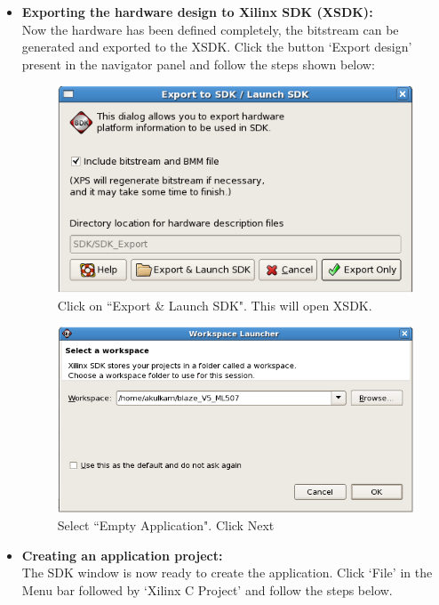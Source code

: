 \documentclass[a4paper,oneside]{memoir}
\begin{document}
\begin{itemize}
\item \textbf{Exporting the hardware design to Xilinx SDK (XSDK):}\label{sec:expot_sdk_blaze}\\
Now the hardware has been defined completely, the bitstream can be generated and exported to the XSDK. Click the button `Export design' present in the navigator panel and follow the steps shown below:

\begin{figure}[H]
\centering
\includegraphics[scale=0.5]{softwarestep1}
\caption{Click on ``Export \& Launch SDK". This will open XSDK. \label{fig:softwarestep1}}
\end{figure}
\begin{figure}[H]
\centering
\includegraphics[scale=0.5]{softwarestep2}
\caption{Select ``Empty Application". Click Next \label{fig:softwarestep2}}
\end{figure}

\item \textbf{Creating an application project:}\label{sec:creating_application_blaze}\\
The SDK window is now ready to create the application. Click `File' in the Menu bar followed by `Xilinx C Project' and follow the steps below.


\end{itemize}
\end{document}
